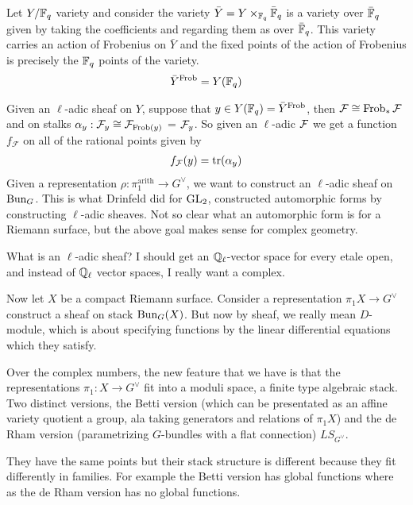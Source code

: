 \documentclass[12pt]{article}
\begin{document}
\begin{remark}
     Let $Y/\mathbb{F}_q$ variety and consider the variety $\bar Y = Y \times_{\mathbb{F}_q} \bar {\mathbb{F}}_q$ is a variety over $\bar{\mathbb{F}}_q$ given by taking the coefficients and regarding them as over $\bar {\mathbb{F}}_q$. This variety carries an action of Frobenius on $\bar Y$ and the fixed points of the action of Frobenius is precisely the $\mathbb{F}_q$ points of the variety. \begin{align*}
        \bar{Y}^{\text{Frob}} = Y(\mathbb{F}_q)
    \end{align*}
\end{remark}
Given an $\ell$-adic sheaf on $Y$, suppose that $y\in Y(\mathbb{F}_q) = \bar{Y}^{\text{Frob}}$, then ${\mathcal{F}} \cong \operatorname{Frob}_*{\mathcal{F}}$ and on stalks $\alpha_y: {\mathcal{F}}_y \cong {\mathcal{F}}_{\operatorname{Frob}(y)}$ = ${\mathcal{F}}_y$. So given an $\ell$-adic ${\mathcal{F}}$ we get a function $f_{\mathcal{F}}$ on all of the rational points given by \begin{align*}
    f_{\mathcal{F}}(y) = \operatorname{tr}(\alpha_y)
\end{align*}
Given a representation $\rho: \pi_1^{\text{arith}} \to G^\vee$, we want to construct an $\ell$-adic sheaf on $\operatorname{Bun}_G$. This is what Drinfeld did for $\operatorname{GL}_2$, constructed automorphic forms by constructing $\ell$-adic sheaves. Not so clear what an automorphic form is for a Riemann surface, but the above goal makes sense for complex geometry.

\begin{remark}
    What is an $\ell$-adic sheaf? I should get an $\mathbb{Q}_\ell$-vector space for every etale open, and instead of $\mathbb{Q}_\ell$ vector spaces, I really want a complex. 
\end{remark}

Now let $X$ be a compact Riemann surface. Consider a representation $\pi_1 X \to G^\vee$ construct a sheaf on stack $\operatorname{Bun}_G(X)$. But now by sheaf, we really mean $D$-module, which is about specifying functions by the linear differential equations which they satisfy. 

Over the complex numbers, the new feature that we have is that the representations $\pi_1: X\to G^\vee$ fit into a moduli space, a finite type algebraic stack. Two distinct versions, the Betti version (which can be presentated as an affine variety quotient a group, ala taking generators and relations of $\pi_1 X$) and the de Rham version (parametrizing $G$-bundles with a flat connection) $LS_{G^\vee}$. 

They have the same points but their stack structure is different because they fit differently in families. For example the Betti version has global functions where as the de Rham version has no global functions. 
\end{document}
